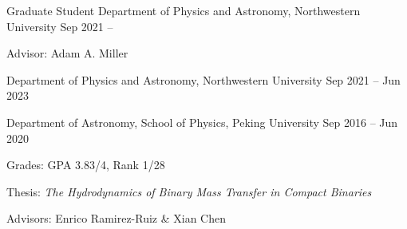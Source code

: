 


\begin{cventries}



\cvsimpentry
{Graduate Student} %
{Department of Physics and Astronomy, Northwestern University} %
{Sep 2021 -- } %
{ \begin{cvitems}
	\item {Advisor: Adam A. Miller}
\end{cvitems}
}

\cvsimpentry
{} %
{Department of Physics and Astronomy, Northwestern University} %
{Sep 2021 -- Jun 2023} %
{}

\cvsimpentry
{} %
{Department of Astronomy, School of Physics, Peking University} %
{Sep 2016 -- Jun 2020} %
{ %
	\begin{cvitems}
		\item {Grades: GPA 3.83/4, Rank 1/28}
		\item {Thesis: \textit{The Hydrodynamics of Binary Mass Transfer in Compact Binaries}}
		\item {Advisors: Enrico Ramirez-Ruiz \& Xian Chen}
	\end{cvitems}
}

\end{cventries}